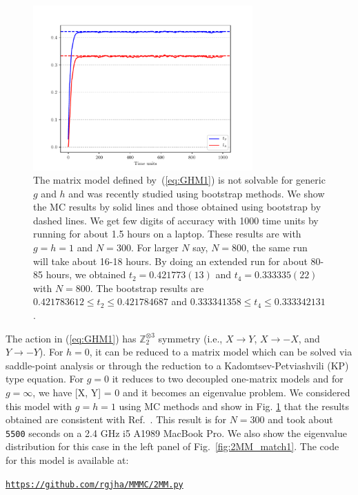 \documentclass[letter,11pt]{article}
\begin{document}
\begin{figure}[htbp] 
	\centering 
	\includegraphics[width=0.75\textwidth]{figs/plot_2MM_sym1.pdf}
	\caption{\label{fig:2MM_match}The matrix model defined by~(\ref{eq:GHM1}) is not solvable for generic $g$ and $h$ and was recently studied using bootstrap methods. We show the MC results by solid lines and those obtained using bootstrap by dashed lines. We get few digits of accuracy with 1000 time units by running for about 1.5 hours on a laptop. These results are with $g=h=1$ and $N=300$. For larger $N$ say, $N=800$, the same run will take about 16-18 hours. By doing an extended run for about 80-85 hours, we obtained $t_{2} = 0.421773(13) $ and $t_{4}=0.333335(22)$ with $N=800$. The bootstrap results are $0.421783612 \le t_{2} \le 0.421784687$ and $0.333341358 \le t_{4} \le 0.333342131$ \cite{Kazakov:2021lel}.}
\end{figure} 

The action in (\ref{eq:GHM1}) has $\mathbb{Z}_{2}^{\otimes 3}$ symmetry 
(i.e., $X \to Y$, $X \to -X$, and $Y \to -Y$). For $h = 0$, it can be reduced to a
matrix model which can be solved via saddle-point analysis or through the reduction 
to a Kadomtsev-Petviashvili (KP) type equation. 
For $g = 0$ it reduces to two decoupled one-matrix models 
and for $g = \infty$, we have [X, Y] = 0 and it becomes an eigenvalue problem. 
We considered this model with $g=h=1$ using MC methods and show in Fig. \ref{fig:2MM_match} that the results obtained are consistent with Ref.~\cite{Kazakov:2021lel}. 
This result is for $N = 300$ and took about \texttt{5500} seconds on a 2.4 GHz i5 A1989 MacBook Pro. We also show the eigenvalue distribution for this case in the left panel of Fig.~\ref{fig:2MM_match1}. The code for this model is available at:  
\begin{center} 
	\texttt{\href{https://github.com/rgjha/MMMC/2MM.py}{https://github.com/rgjha/MMMC/2MM.py}}
 \end{center}
\end{document}
